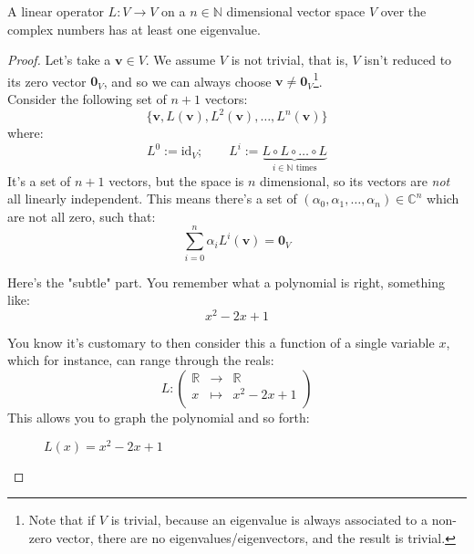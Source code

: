 \documentclass[solutions.tex]{subfiles}
\renewcommand{\bm}[1]{\pmb{#1}}
\begin{document}
\begin{lemma} A linear operator $L : V \rightarrow V$
on a $n\in\mathbb{N}$ dimensional vector space $V$
over the complex numbers has at least one eigenvalue.
\end{lemma}
\begin{proof}
Let's take a $\bm{v}\in V$. We assume $V$ is not trivial, that
is, $V$ isn't reduced to its zero vector $\bm{0}_V$, and so
we can always choose $\bm{v} \neq \bm{0}_V$\footnote{Note that
if $V$ is trivial, because an eigenvalue is always associated
to a non-zero vector, there are no eigenvalues/eigenvectors, and
the result is trivial.}. \\

Consider the following set of $n+1$ vectors:
\[
	\{ \bm{v}, L(\bm{v}), L^2(\bm{v}), \ldots, L^n(\bm{v}) \}
\]
where:
\[
	L^0 := \text{id}_V;\qquad L^i := \underbrace{
		L\circ L\circ\ldots\circ L
	}_{i\in\mathbb{N}\text{ times}}
\]
It's a set of $n+1$ vectors, but the space is $n$ dimensional, so
its vectors are \textit{not} all linearly independent. This
means there's a set of $(\alpha_0, \alpha_1, \ldots, \alpha_n)\in\mathbb{C}^n$
which are not all zero, such that:
\begin{equation}
	\sum_{i=0}^n \alpha_iL^i(\bm{v}) = \bm{0}_V \label{qm:L03E01:not-linindep}
\end{equation}

Here's the "subtle" part. You remember what a polynomial is right,
something like: \[ x^2 - 2x + 1 \]

You know it's customary to then consider this a function of
a single variable $x$, which for instance, can range through
the reals:
\[
	L : \begin{pmatrix}
		\mathbb{R} & \rightarrow & \mathbb{R} \\
		x & \mapsto & x^2 - 2x + 1 \\
	\end{pmatrix}
\]
This allows you to graph the polynomial and so forth:

\begin{figure}[H]
	\centering
	\caption{$L(x) = x^2 - 2x + 1$}
\end{figure}


\end{proof}
\end{document}
